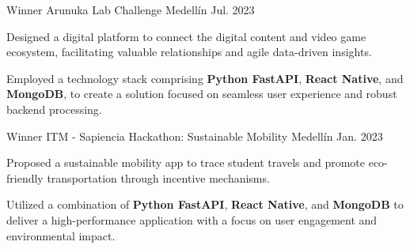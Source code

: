 
\begin{cventries}
\cventry
{Winner} %
{Arunuka Lab Challenge} %
{Medellín} %
{Jul. 2023} %
{
  \begin{cvitems} %
    \item {Designed a digital platform to connect the digital content and video game ecosystem, facilitating valuable relationships and agile data-driven insights.}
    \item {Employed a technology stack comprising \textbf{Python FastAPI}, \textbf{React Native}, and \textbf{MongoDB}, to create a solution focused on seamless user experience and robust backend processing.}
  \end{cvitems}
}

\cventry
{Winner} %
{ITM - Sapiencia Hackathon: Sustainable Mobility} %
{Medellín} %
{Jan. 2023} %
{
  \begin{cvitems} %
    \item {Proposed a sustainable mobility app to trace student travels and promote eco-friendly transportation through incentive mechanisms.}
    \item {Utilized a combination of \textbf{Python FastAPI}, \textbf{React Native}, and \textbf{MongoDB} to deliver a high-performance application with a focus on user engagement and environmental impact.}
  \end{cvitems}
}

\end{cventries}
